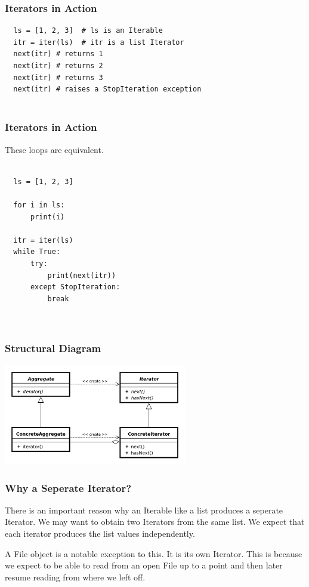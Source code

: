 \documentclass[10pt]{beamer}
\begin{document}
\begin{frame}[fragile]
  \frametitle{Iterators in Action}

  \begin{verbatim}
  ls = [1, 2, 3]  # ls is an Iterable
  itr = iter(ls)  # itr is a list Iterator
  next(itr) # returns 1
  next(itr) # returns 2
  next(itr) # returns 3
  next(itr) # raises a StopIteration exception
  
  \end{verbatim}
 \end{frame} 

\begin{frame}[fragile]
  \frametitle{Iterators in Action}

  These loops are equivalent.
  \begin{verbatim}

  ls = [1, 2, 3]
  
  for i in ls:
      print(i)
        
  itr = iter(ls) 
  while True:
      try:
          print(next(itr))
      except StopIteration:
          break    
  
  
  \end{verbatim}
 \end{frame} 


\begin{frame}
  \frametitle{Structural Diagram} 
  \includegraphics[width=8cm]{iterator.png}
  \end{frame}
  

\begin{frame}
  \frametitle{Why a Seperate Iterator?}
  There is an important reason why an Iterable like a list
  produces a seperate Iterator. We may want to obtain two 
  Iterators from the same list. We expect that each iterator produces
  the list values independently.
  
  \vspace{5mm}
  A File object is a notable exception to this. It is its own Iterator.
  This is because we expect to be able to read from an open File up to 
  a point and then later resume reading from where we left off.
 \end{frame} 
 
\end{document}
